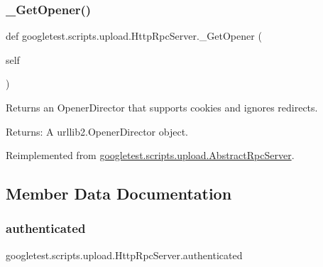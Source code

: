 \mbox{\label{classgoogletest_1_1scripts_1_1upload_1_1_http_rpc_server_aaed250eb0837a8f3b5d7ac5a25faef2e}} 
\subsubsection{\texorpdfstring{\_GetOpener()}{\_GetOpener()}}
{\footnotesize\ttfamily def googletest.\+scripts.\+upload.\+Http\+Rpc\+Server.\+\_\+\+Get\+Opener (\begin{DoxyParamCaption}\item[{}]{self }\end{DoxyParamCaption})\hspace{0.3cm}{\ttfamily [private]}}

\begin{DoxyVerb}Returns an OpenerDirector that supports cookies and ignores redirects.

Returns:
  A urllib2.OpenerDirector object.
\end{DoxyVerb}
 

Reimplemented from \mbox{\hyperlink{classgoogletest_1_1scripts_1_1upload_1_1_abstract_rpc_server_a63eceb4f0652dd8b366a9d1c68405d28}{googletest.\+scripts.\+upload.\+Abstract\+Rpc\+Server}}.



\subsection{Member Data Documentation}
\mbox{\label{classgoogletest_1_1scripts_1_1upload_1_1_http_rpc_server_af8b31a303bd2e1d84f3771336cdbeb8e}} 
\subsubsection{\texorpdfstring{authenticated}{authenticated}}
{\footnotesize\ttfamily googletest.\+scripts.\+upload.\+Http\+Rpc\+Server.\+authenticated}

